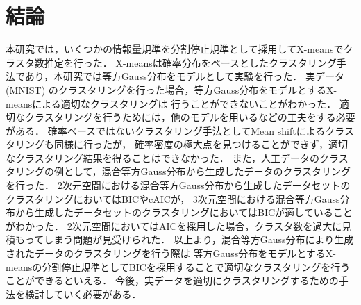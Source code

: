 \section{結論}

本研究では，いくつかの情報量規準を分割停止規準として採用してX-meansでクラスタ数推定を行った．
X-meansは確率分布をベースとしたクラスタリング手法であり，本研究では等方Gauss分布をモデルとして実験を行った．
実データ (MNIST) のクラスタリングを行った場合，等方Gauss分布をモデルとするX-meansによる適切なクラスタリングは
行うことができないことがわかった．
適切なクラスタリングを行うためには，他のモデルを用いるなどの工夫をする必要がある．
確率ベースではないクラスタリング手法としてMean shiftによるクラスタリングも同様に行ったが，
確率密度の極大点を見つけることができず，適切なクラスタリング結果を得ることはできなかった．
また，人工データのクラスタリングの例として，混合等方Gauss分布から生成したデータのクラスタリングを行った．
2次元空間における混合等方Gauss分布から生成したデータセットのクラスタリングにおいてはBICやcAICが，
3次元空間における混合等方Gauss分布から生成したデータセットのクラスタリングにおいてはBICが適していることがわかった．
2次元空間においてはAICを採用した場合，クラスタ数を過大に見積もってしまう問題が見受けられた．
以上より，混合等方Gauss分布により生成されたデータのクラスタリングを行う際は
等方Gauss分布をモデルとするX-meansの分割停止規準としてBICを採用することで適切なクラスタリングを行うことができるといえる．
今後，実データを適切にクラスタリングするための手法を検討していく必要がある．
